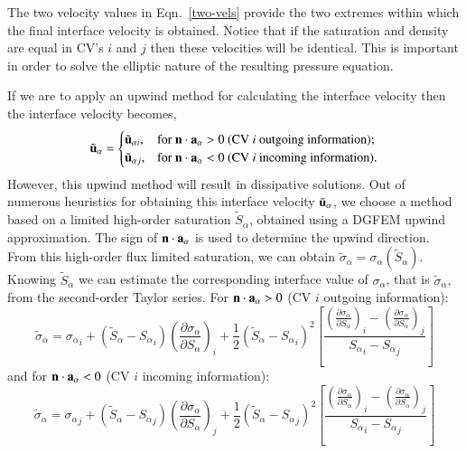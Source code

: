 \documentclass[preprint,authoryear,12pt]{elsarticle}
\begin{document}
The two velocity values in Eqn.~\ref{two-vels} provide the two extremes within which the final interface velocity is obtained. Notice that if the saturation and density are equal in CV's $i$ and $j$ then these velocities will be identical. This is important in order to solve the elliptic nature of the resulting pressure equation.

If we are to apply an upwind method for calculating the interface velocity then the interface velocity becomes, %
\begin{displaymath}
{\tilde{\bf u}}_{\alpha} =
\begin{cases}
\tilde{\bf u}_{\alpha i}, & \text{for } {\bf n}\cdot{\bf a}_{\alpha}>0 \text{ (CV {\it i} outgoing information);} \\
\tilde{\bf u}_{\alpha j}, & \text{for } {\bf n}\cdot{\bf a}_{\alpha}<0 \text{ (CV {\it i} incoming information).} 
\end{cases}
\end{displaymath}
However, this upwind method will result in dissipative solutions. Out of numerous heuristics for obtaining this interface velocity ${\tilde{\bf u}}_\alpha$, we choose a method based on a limited high-order saturation $\tilde S_\alpha$, obtained using a DGFEM upwind approximation. The sign of ${\bf n}\cdot {\bf a}_\alpha$ is used to determine the upwind direction. From this high-order flux limited saturation, we can obtain $\tilde{\sigma}_{\alpha} = \sigma_{\alpha}\left(\tilde{S}_{\alpha}\right)$. Knowing $\tilde S_\alpha$ we can estimate the corresponding interface value of $\sigma_\alpha$, that is $\tilde\sigma_\alpha,$ from the second-order Taylor series. For ${\bf n}\cdot {\bf a}_\alpha>0$ (CV $i$ outgoing information):
\begin{equation}
  \tilde\sigma_\alpha = {\sigma_\alpha}_i + \left(\tilde S_\alpha - {S_\alpha}_i\right) \left(\frac{\partial\sigma_\alpha}{\partial S_\alpha}\right)_i + \frac{1}{2}  \left(\tilde S_\alpha - {S_\alpha}_i\right)^2 \left[ \frac{\left(\frac{\partial\sigma_\alpha}{\partial S_\alpha}\right)_i - \left(\frac{\partial\sigma_\alpha}{\partial S_\alpha}\right)_j } {{S_\alpha}_i -  {S_\alpha}_j} \right]
  \label{sigma-out}
\end{equation} 
and for ${\bf n}\cdot {\bf a}_\alpha<0$ (CV $i$ incoming information):
\begin{equation}
  \tilde\sigma_\alpha = {\sigma_\alpha}_j + \left(\tilde S_\alpha - {S_\alpha}_j\right) \left(\frac{\partial\sigma_\alpha}{\partial S_\alpha}\right)_j +\frac{1}{2} \left(\tilde S_\alpha - {S_\alpha}_j\right)^2 \left[ \frac{\left(\frac{\partial\sigma_\alpha}{\partial S_\alpha}\right)_i - \left(\frac{\partial\sigma_\alpha}{\partial S_\alpha}\right)_j } {{S_\alpha}_i - {S_\alpha}_j} \right]
  \label{sigma-in}
\end{equation} 
\end{document}

